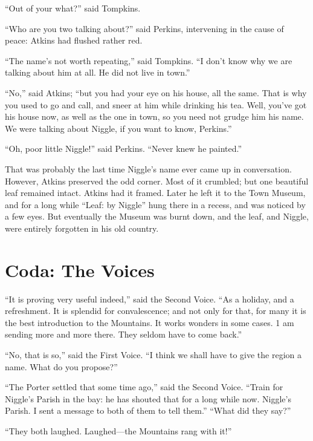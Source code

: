 \documentclass[english]{scrartcl}
\begin{document}
“Out of your what?” said Tompkins.

“Who are you two talking about?” said Perkins, intervening in the cause of peace: Atkins had flushed rather red.

“The name’s not worth repeating,” said Tompkins. “I don’t know why we are talking about him at all. He did not live in town.”

“No,” said Atkins; “but you had your eye on his house, all the same. That is why you used to go and call, and sneer at him while drinking his tea. Well, you’ve got his house now, as well as the one in town, so you need not grudge him his name. We were talking about Niggle, if you want to know, Perkins.”

“Oh, poor little Niggle!” said Perkins. “Never knew he painted.”

That was probably the last time Niggle’s name ever came up in conversation. However, Atkins preserved the odd corner. Most of it crumbled; but one beautiful leaf remained intact. Atkins had it framed. Later he left it to the Town Museum, and for a long while “Leaf: by Niggle” hung there in a recess, and was noticed by a few eyes. But eventually the Museum was burnt down, and the leaf, and Niggle, were entirely forgotten in his old country.

\section*{Coda: The Voices}

“It is proving very useful indeed,” said the Second Voice. “As a holiday, and a refreshment. It is splendid for convalescence; and not only for that, for many it is the best introduction to the Mountains. It works wonders in some cases. 1 am sending more and more there. They seldom have to come back.”

“No, that is so,” said the First Voice. “I think we shall have to give the region a name. What do you propose?”

“The Porter settled that some time ago,” said the Second Voice. “Train for Niggle’s Parish in the bay: he has shouted that for a long while now. Niggle’s Parish. I sent a message to both of them to tell them.” “What did they say?”

“They both laughed. Laughed—the Mountains rang with it!”
\end{document}
